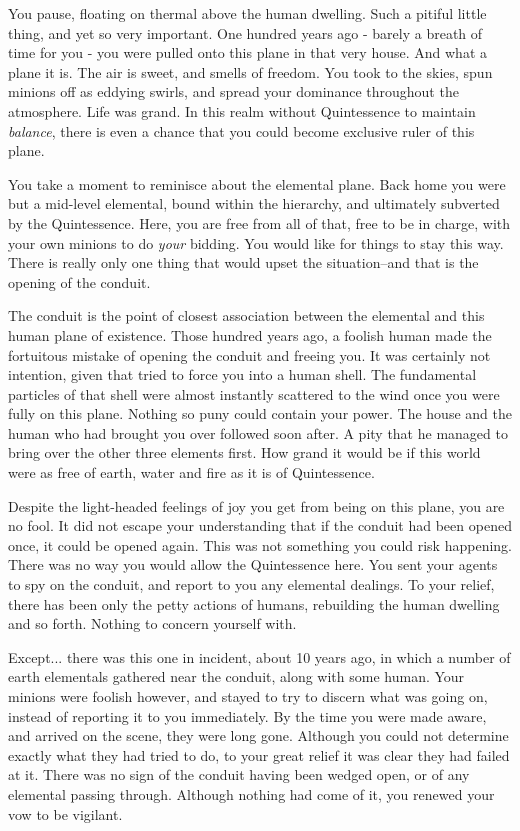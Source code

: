 \documentclass[char]{guildcamp1}
\begin{document}
\name{\cKing{}}

You pause, floating on thermal above the human dwelling. Such a pitiful little thing, and yet so very important. One hundred years ago - barely a breath of time for you - you were pulled onto this plane in that very house. And what a plane it is. The air is sweet, and smells of freedom. You took to the skies, spun minions off as eddying swirls, and spread your dominance throughout the atmosphere.  Life was grand. In this realm without Quintessence to maintain {\emph{balance}}, there is even a chance that you could become exclusive ruler of this plane.

You take a moment to reminisce about the elemental plane. Back home you were but a mid-level elemental, bound within the hierarchy, and ultimately subverted by the Quintessence. Here, you are free from all of that, free to be in charge, with your own minions to do {\emph{your}} bidding. You would like for things to stay this way. There is really only one thing that would upset the situation--and that is the opening of the conduit.

The conduit is the point of closest association between the elemental and this human plane of existence. Those hundred years ago, a foolish human made the fortuitous mistake of opening the conduit and freeing you. It was certainly not \cGrandfather{\their} intention, given that \cGrandfather{\they} tried to force you into a human shell. The fundamental particles of that shell were almost instantly scattered to the wind once you were fully on this plane. Nothing so puny could contain your power. The house and the human who had brought you over followed soon after. A pity that he managed to bring over the other three elements first. How grand it would  be if this world were as free of earth, water and fire as it is of Quintessence.

Despite the  light-headed feelings of joy you get from being on this plane, you are no fool. It did not escape your understanding that if the conduit had been opened once, it could be opened again. This was not something you could risk happening. There was no way you would allow the Quintessence here. You sent your agents to spy on the conduit, and report to you any elemental dealings. To your relief, there has been only the petty actions of humans, rebuilding the human dwelling and so forth. Nothing to concern yourself with.

Except... there was this one in incident, about 10 years ago, in which a number of earth elementals gathered near the conduit, along with some human. Your minions were foolish however, and stayed to try to discern what was going on, instead of reporting it to you immediately. By the time you were made aware, and arrived on the scene, they were long gone. Although you could not determine exactly  what they had tried to do, to your great relief it was clear they had failed at it. There was no sign of the conduit having been wedged open, or of any elemental passing through. Although nothing had come of it, you renewed your vow to be vigilant.
\end{document}
